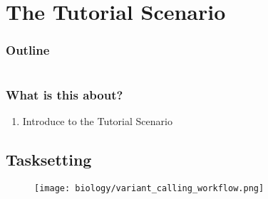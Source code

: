 \section{The Tutorial Scenario}

\begin{frame}
    \frametitle{Outline}
    \begin{columns}[t]
        \begin{column}{.5\textwidth}
            \tableofcontents[sections={1-7},currentsection]
        \end{column}
        \begin{column}{.5\textwidth}
            \tableofcontents[sections={8-15},currentsection]
        \end{column}
    \end{columns}
\end{frame}

\begin{frame}
	\frametitle{What is this about?}
	\begin{docs}[Objective]
		\begin{enumerate}
			\item Introduce to the Tutorial Scenario 
		\end{enumerate}
	\end{docs}
\end{frame}

\subsection{Tasksetting}

\begin{frame}
  \begin{figure}
    \centering
    \texttt{[image: biology/variant\_calling\_workflow.png]}
  \end{figure}
\end{frame}




